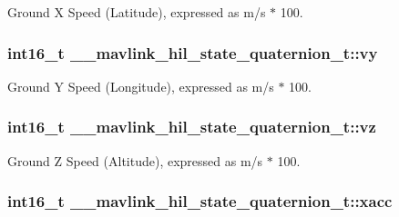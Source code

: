 Ground X Speed (Latitude), expressed as m/s $\ast$ 100. 

\hypertarget{struct____mavlink__hil__state__quaternion__t_ae13c1fd1447d434847c4791181e270c1}{
\subsubsection[{vy}]{\setlength{\rightskip}{0pt plus 5cm}int16\+\_\+t \+\_\+\+\_\+mavlink\+\_\+hil\+\_\+state\+\_\+quaternion\+\_\+t\+::vy}}\label{struct____mavlink__hil__state__quaternion__t_ae13c1fd1447d434847c4791181e270c1}


Ground Y Speed (Longitude), expressed as m/s $\ast$ 100. 

\hypertarget{struct____mavlink__hil__state__quaternion__t_a40093764fa265d7443ce5d6215bc6cfa}{
\subsubsection[{vz}]{\setlength{\rightskip}{0pt plus 5cm}int16\+\_\+t \+\_\+\+\_\+mavlink\+\_\+hil\+\_\+state\+\_\+quaternion\+\_\+t\+::vz}}\label{struct____mavlink__hil__state__quaternion__t_a40093764fa265d7443ce5d6215bc6cfa}


Ground Z Speed (Altitude), expressed as m/s $\ast$ 100. 

\hypertarget{struct____mavlink__hil__state__quaternion__t_a72af144dbb58ba6cd5a474206a88420f}{
\subsubsection[{xacc}]{\setlength{\rightskip}{0pt plus 5cm}int16\+\_\+t \+\_\+\+\_\+mavlink\+\_\+hil\+\_\+state\+\_\+quaternion\+\_\+t\+::xacc}}\label{struct____mavlink__hil__state__quaternion__t_a72af144dbb58ba6cd5a474206a88420f}


